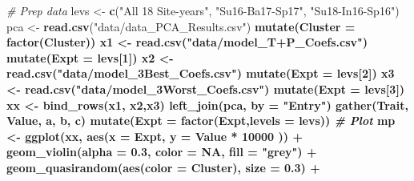 \documentclass[
]{article}
\newenvironment{Shaded}{\begin{snugshade}}{\end{snugshade}}
\newcommand{\CommentTok}[1]{\textcolor[rgb]{0.56,0.35,0.01}{\textit{#1}}}
\newcommand{\DataTypeTok}[1]{\textcolor[rgb]{0.13,0.29,0.53}{#1}}
\newcommand{\DecValTok}[1]{\textcolor[rgb]{0.00,0.00,0.81}{#1}}
\newcommand{\FloatTok}[1]{\textcolor[rgb]{0.00,0.00,0.81}{#1}}
\newcommand{\KeywordTok}[1]{\textcolor[rgb]{0.13,0.29,0.53}{\textbf{#1}}}
\newcommand{\NormalTok}[1]{#1}
\newcommand{\OperatorTok}[1]{\textcolor[rgb]{0.81,0.36,0.00}{\textbf{#1}}}
\newcommand{\OtherTok}[1]{\textcolor[rgb]{0.56,0.35,0.01}{#1}}
\newcommand{\StringTok}[1]{\textcolor[rgb]{0.31,0.60,0.02}{#1}}
\begin{document}
\begin{Shaded}
\begin{Highlighting}[]
\CommentTok{# Prep data}
\NormalTok{levs <-}\StringTok{ }\KeywordTok{c}\NormalTok{(}\StringTok{"All 18 Site-years"}\NormalTok{, }\StringTok{"Su16-Ba17-Sp17"}\NormalTok{, }\StringTok{"Su18-In16-Sp16"}\NormalTok{)}
\NormalTok{pca <-}\StringTok{ }\KeywordTok{read.csv}\NormalTok{(}\StringTok{"data/data_PCA_Results.csv"}\NormalTok{) }\OperatorTok{%
\StringTok{  }\KeywordTok{mutate}\NormalTok{(}\DataTypeTok{Cluster =} \KeywordTok{factor}\NormalTok{(Cluster))}
\NormalTok{x1 <-}\StringTok{ }\KeywordTok{read.csv}\NormalTok{(}\StringTok{"data/model_T+P_Coefs.csv"}\NormalTok{) }\OperatorTok{%
\StringTok{  }\KeywordTok{mutate}\NormalTok{(}\DataTypeTok{Expt =}\NormalTok{ levs[}\DecValTok{1}\NormalTok{]) }\OperatorTok{%
\NormalTok{x2 <-}\StringTok{ }\KeywordTok{read.csv}\NormalTok{(}\StringTok{"data/model_3Best_Coefs.csv"}\NormalTok{) }\OperatorTok{%
\StringTok{  }\KeywordTok{mutate}\NormalTok{(}\DataTypeTok{Expt =}\NormalTok{ levs[}\DecValTok{2}\NormalTok{])}
\NormalTok{x3 <-}\StringTok{ }\KeywordTok{read.csv}\NormalTok{(}\StringTok{"data/model_3Worst_Coefs.csv"}\NormalTok{) }\OperatorTok{%
\StringTok{  }\KeywordTok{mutate}\NormalTok{(}\DataTypeTok{Expt =}\NormalTok{ levs[}\DecValTok{3}\NormalTok{])}
\NormalTok{xx <-}\StringTok{ }\KeywordTok{bind_rows}\NormalTok{(x1, x2,x3) }\OperatorTok{%
\StringTok{  }\KeywordTok{left_join}\NormalTok{(pca, }\DataTypeTok{by =} \StringTok{"Entry"}\NormalTok{) }\OperatorTok{%
\StringTok{  }\KeywordTok{gather}\NormalTok{(Trait, Value, a, b, c) }\OperatorTok{%
\StringTok{  }\KeywordTok{mutate}\NormalTok{(}\DataTypeTok{Expt =} \KeywordTok{factor}\NormalTok{(Expt,}\DataTypeTok{levels =}\NormalTok{ levs))}
\CommentTok{# Plot}
\NormalTok{mp <-}\StringTok{ }\KeywordTok{ggplot}\NormalTok{(xx, }\KeywordTok{aes}\NormalTok{(}\DataTypeTok{x =}\NormalTok{ Expt, }\DataTypeTok{y =}\NormalTok{ Value }\OperatorTok{*}\StringTok{ }\DecValTok{10000}\NormalTok{ )) }\OperatorTok{+}
\StringTok{  }\KeywordTok{geom_violin}\NormalTok{(}\DataTypeTok{alpha =} \FloatTok{0.3}\NormalTok{, }\DataTypeTok{color =} \OtherTok{NA}\NormalTok{, }\DataTypeTok{fill =} \StringTok{"grey"}\NormalTok{) }\OperatorTok{+}\StringTok{ }
\StringTok{  }\KeywordTok{geom_quasirandom}\NormalTok{(}\KeywordTok{aes}\NormalTok{(}\DataTypeTok{color =}\NormalTok{ Cluster), }\DataTypeTok{size =} \FloatTok{0.3}\NormalTok{) }\OperatorTok{+}\StringTok{ }
}}}}}}}}
\end{Highlighting}
\end{Shaded}
\end{document}

